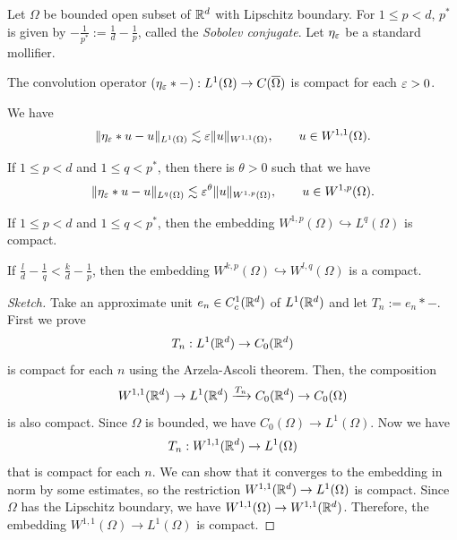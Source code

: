 \documentclass{../../large}
\begin{document}
\begin{prb}
Let $\Omega$ be bounded open subset of $\mathbb{R}^d$ with Lipschitz boundary.
For $1\le p<d$, $p^*$ is given by $-\frac1{p^*}:=\frac1d-\frac1p$, called the \emph{Sobolev conjugate}.
Let $\eta_\varepsilon$ be a standard mollifier.
\begin{parts}
\item The convolution operator $(\eta_\varepsilon*-):L^1(\Omega)\to C(\overline\Omega)$ is compact for each $\varepsilon>0$.
\item We have
\[\|\eta_\varepsilon*u-u\|_{L^1(\Omega)}\lesssim\varepsilon\|u\|_{W^{1,1}(\Omega)},\qquad u\in W^{1,1}(\Omega).\]
\item If $1\le p<d$ and $1\le q<p^*$, then there is $\theta>0$ such that we have
\[\|\eta_\varepsilon*u-u\|_{L^q(\Omega)}\lesssim\varepsilon^\theta\|u\|_{W^{1,p}(\Omega)},\qquad u\in W^{1,p}(\Omega).\]
\item If $1\le p<d$ and $1\le q<p^*$, then the embedding $W^{1,p}(\Omega)\hookrightarrow L^q(\Omega)$ is compact.
\item If $\frac ld-\frac1q<\frac kd-\frac1p$, then the embedding $W^{k,p}(\Omega)\hookrightarrow W^{l,q}(\Omega)$ is a compact.
\end{parts}
\end{prb}
\begin{proof}[Sketch]
Take an approximate unit $e_n\in C_c^1(\mathbb{R}^d)$ of $L^1(\mathbb{R}^d)$ and let $T_n:=e_n*-$.
First we prove
\[T_n:L^1(\mathbb{R}^d)\to C_0(\mathbb{R}^d)\]
is compact for each $n$ using the Arzela-Ascoli theorem.
Then, the composition
\[W^{1,1}(\mathbb{R}^d)\to L^1(\mathbb{R}^d)\xrightarrow{T_n}C_0(\mathbb{R}^d)\to C_0(\Omega)\]
is also compact.
Since $\Omega$ is bounded, we have $C_0(\Omega)\to L^1(\Omega)$.
Now we have
\[T_n:W^{1,1}(\mathbb{R}^d)\to L^1(\Omega)\]
that is compact for each $n$.
We can show that it converges to the embedding in norm by some estimates, so the restriction $W^{1,1}(\mathbb{R}^d)\to L^1(\Omega)$ is compact.
Since $\Omega$ has the Lipschitz boundary, we have $W^{1,1}(\Omega)\to W^{1,1}(\mathbb{R}^d)$.
Therefore, the embedding $W^{1,1}(\Omega)\to L^1(\Omega)$ is compact.
\end{proof}
\end{document}
